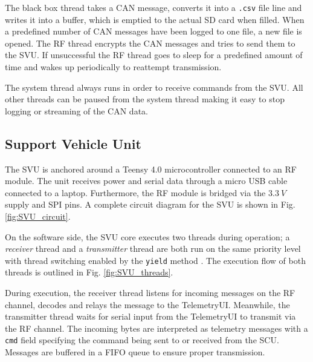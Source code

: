 \documentclass[a4paper,conference]{IEEEtran}
\begin{document}
The black box thread takes a CAN message, converts it into a \texttt{.csv} file line and writes it into a buffer, which is emptied to the actual SD card when filled. When a predefined number of CAN messages have been logged to one file, a new file is opened. The RF thread encrypts the CAN messages and tries to send them to the SVU. If unsuccessful the RF thread goes to sleep for a predefined amount of time and wakes up periodically to reattempt transmission.

The system thread always runs in order to receive commands from the SVU. All other threads can be paused from the system thread making it easy to stop logging or streaming of the CAN data.

\subsection{Support Vehicle Unit}
The SVU is anchored around a Teensy 4.0 microcontroller connected to an RF module. The unit receives power and serial data through a micro USB cable connected to a laptop. Furthermore, the RF module is bridged via the $\SI{3.3}{V}$ supply and SPI pins. A complete circuit diagram for the SVU is shown in Fig. \ref{fig:SVU_circuit}.

On the software side, the SVU core executes two threads during operation; a \textit{receiver} thread and a \textit{transmitter} thread are both run on the same priority level with thread switching enabled by the \texttt{yield} method \cite{chibiOsYield}. The execution flow of both threads is outlined in Fig. \ref{fig:SVU_threads}. 

During execution, the receiver thread listens for incoming messages on the RF channel, decodes and relays the message to the TelemetryUI. Meanwhile, the transmitter thread waits for serial input from the TelemetryUI to transmit via the RF channel. The incoming bytes are interpreted as telemetry messages with a \texttt{cmd} field specifying the command being sent to or received from the SCU. Messages are buffered in a FIFO queue to ensure proper transmission.
\end{document}
